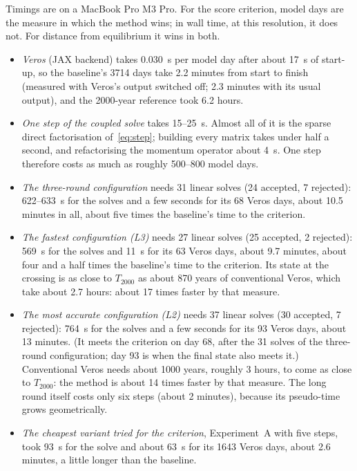 \documentclass{article}
\begin{document}
Timings are on a MacBook Pro M3 Pro. For the score criterion, model days are the measure in which the method wins; in wall time, at this resolution, it does not. For distance from equilibrium it wins in both.
\begin{itemize}
\item \emph{Veros} (JAX backend) takes 0.030~s per model day after about 17~s of start-up, so the baseline's 3714 days take 2.2 minutes from start to finish (measured with Veros's output switched off; 2.3 minutes with its usual output), and the 2000-year reference took 6.2 hours.
\item \emph{One step of the coupled solve} takes 15--25~s. Almost all of it is the sparse direct factorisation of~\eqref{eq:step}; building every matrix takes under half a second, and refactorising the momentum operator about 4~s. One step therefore costs as much as roughly 500--800 model days.
\item \emph{The three-round configuration} needs 31 linear solves (24 accepted, 7 rejected): 622--633~s for the solves and a few seconds for its 68 Veros days, about 10.5 minutes in all, about five times the baseline's time to the criterion.
\item \emph{The fastest configuration (L3)} needs 27 linear solves (25 accepted, 2 rejected): 569~s for the solves and 11~s for its 63 Veros days, about 9.7 minutes, about four and a half times the baseline's time to the criterion. Its state at the crossing is as close to $T_{2000}$ as about 870 years of conventional Veros, which take about 2.7 hours: about 17 times faster by that measure.
\item \emph{The most accurate configuration (L2)} needs 37 linear solves (30 accepted, 7 rejected): 764~s for the solves and a few seconds for its 93 Veros days, about 13 minutes. (It meets the criterion on day 68, after the 31 solves of the three-round configuration; day 93 is when the final state also meets it.) Conventional Veros needs about 1000 years, roughly 3 hours, to come as close to $T_{2000}$: the method is about 14 times faster by that measure. The long round itself costs only six steps (about 2 minutes), because its pseudo-time grows geometrically.
\item \emph{The cheapest variant tried for the criterion}, Experiment~A with five steps, took 93~s for the solve and about 63~s for its 1643 Veros days, about 2.6 minutes, a little longer than the baseline.
\end{itemize}
\end{document}
